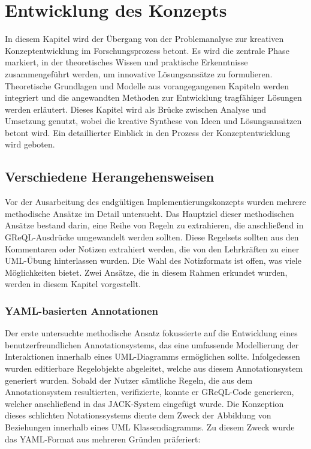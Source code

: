\chapter{Entwicklung des Konzepts}

In diesem Kapitel wird der Übergang von der Problemanalyse zur kreativen Konzeptentwicklung im Forschungsprozess betont.
Es wird die zentrale Phase markiert, in der theoretisches Wissen und praktische Erkenntnisse zusammengeführt werden, um
innovative Lösungsansätze zu formulieren. Theoretische Grundlagen und Modelle aus vorangegangenen Kapiteln werden
integriert und die angewandten Methoden zur Entwicklung tragfähiger Lösungen werden erläutert. Dieses Kapitel wird als
Brücke zwischen Analyse und Umsetzung genutzt, wobei die kreative Synthese von Ideen und Lösungsansätzen betont wird.
Ein detaillierter Einblick in den Prozess der Konzeptentwicklung wird geboten.

\section{Verschiedene Herangehensweisen}

Vor der Ausarbeitung des endgültigen Implementierungskonzepts wurden mehrere methodische Ansätze im Detail untersucht.
Das Hauptziel dieser methodischen Ansätze bestand darin, eine Reihe von Regeln zu extrahieren, die anschließend in
GReQL-Ausdrücke umgewandelt werden sollten. Diese Regelsets sollten aus den Kommentaren oder Notizen extrahiert werden,
die von den Lehrkräften zu einer UML-Übung hinterlassen wurden. Die Wahl des Notizformats ist offen, was viele
Möglichkeiten bietet. Zwei Ansätze, die in diesem Rahmen erkundet wurden, werden in diesem Kapitel vorgestellt.

\subsection{YAML-basierten Annotationen}

Der erste untersuchte methodische Ansatz fokussierte auf die Entwicklung eines benutzerfreundlichen Annotationsystems, das eine umfassende Modellierung der Interaktionen innerhalb eines UML-Diagramms ermöglichen sollte. Infolgedessen wurden editierbare Regelobjekte abgeleitet, welche aus diesem Annotationsystem generiert wurden. Sobald der Nutzer sämtliche Regeln, die aus dem Annotationsystem resultierten, verifizierte, konnte er GReQL-Code generieren, welcher anschließend in das JACK-System eingefügt wurde. Die Konzeption dieses schlichten Notationssystems diente dem Zweck der Abbildung von Beziehungen innerhalb eines UML Klassendiagramms. Zu diesem Zweck wurde das YAML-Format aus mehreren Gründen präferiert:

